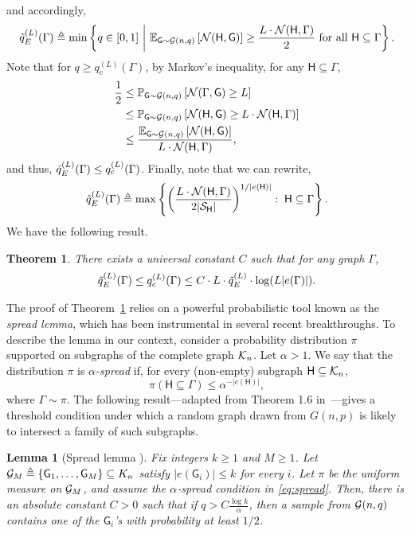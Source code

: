 \documentclass[12pt]{article}
\newtheorem{theorem}{Theorem}
\newtheorem{lemma}{Lemma}
\newcommand{\E}{\mathbb{E}}
\def\P{{\mathbb P}}
\newcommand{\calG}{{\cal G}}
\newcommand{\calK}{{\cal K}}
\newcommand{\calN}{{\cal N}}
\newcommand{\calS}{{\cal S}}
\newcommand{\p}[1]{\left(#1\right)}
\newcommand{\pp}[1]{\left[#1\right]}
\newcommand{\ppp}[1]{\left\{#1\right\}}
\newcommand{\s}[1]{\mathsf{#1}}
\begin{document}
and accordingly,
\begin{align}
    \Tilde{q}_E^{(L)}(\Gamma)\triangleq\min\ppp{q\in[0,1] ~\bigg|~ \E_{\s{G}\sim \calG(n,q)}\pp{\calN(\s{H},\s{G})}\geq \frac{L\cdot \calN(\s{H},\Gamma)}{2}\text{ for all }\s{H}\subseteq \Gamma}.
\end{align} 
Note that for $q\geq q_{c}^{(L)}(\Gamma)$, by Markov's inequality, for any $\s{H}\subseteq\Gamma$,
\begin{align}
    \frac{1}{2}&\leq \P_{\s{G}\sim \calG(n,q)}\pp{\calN(\Gamma,\s{G})\geq L}\\
    &\leq \P_{\s{G}\sim \calG(n,q)}\pp{\calN(\s{H},\s{G})\geq L\cdot \calN(\s{H},\Gamma)}\\
    &\leq \frac{\E_{\s{G}\sim \calG(n,q)}\pp{\calN(\s{H},\s{G})}}{L\cdot \calN(\s{H},\Gamma)},
\end{align}
and thus, $\Tilde{q}_E^{(L)}(\Gamma)\leq q_{c}^{(L)}(\Gamma)$. Finally, note that we can rewrite,
\begin{align}
    \Tilde{q}_E^{(L)}(\Gamma)\triangleq\max\ppp{\p{\frac{L\cdot\calN(\s{H},\Gamma)}{2|\calS_{\s{H}}|}}^{1/|e(\s{H})|}:\;\s{H}\subseteq\Gamma}.\label{eqn:EquivSpreaPro}
\end{align}
We have the following result.
\begin{theorem}\label{th:SpreadGen} There exists a universal constant $C$ such that for any graph $\Gamma$, \begin{align}
    \Tilde{q}_E^{(L)}(\Gamma)\leq q_c^{(L)}(\Gamma)\leq C\cdot L\cdot\Tilde{q}_E^{(L)}\cdot  \log(L|e(\Gamma)|).
\end{align}
\end{theorem}
The proof of Theorem~\ref{th:SpreadGen} relies on a powerful probabilistic tool known as the \emph{spread lemma}, which has been instrumental in several recent breakthroughs. To describe the lemma in our context, consider a probability distribution $\pi$ supported on subgraphs of the complete graph $\calK_n$. Let $\alpha > 1$. We say that the distribution $\pi$ is \emph{$\alpha$-spread} if, for every (non-empty) subgraph $\s{H} \subseteq \calK_n$,
\begin{equation}
\pi(\s{H} \subseteq \Gamma) \leq  \alpha^{-|e(\s{H})|},
\label{eq:spread}
\end{equation}
where $\Gamma\sim \pi$. The following result—adapted from Theorem 1.6 in~\cite{frankl2021fractional}—gives a threshold condition under which a random graph drawn from $G(n,p)$ is likely to intersect a family of such subgraphs.
\begin{lemma}[Spread lemma {\cite[Lemma 2]{mossel2022second}}]
\label{lem:spread}
Fix integers $k\geq  1$ and $M\geq  1$.  
Let $\calG_M\triangleq\ppp{\s{G}_{1},\dots ,\s{G}_{M}}\subseteq K_{n}$ satisfy $|e(\s{G}_{i})|\leq  k$ for every $i$. Let $\pi$ be the uniform measure on $\calG_M$, and assume the
\emph{$\alpha$‑spread} condition in \eqref{eq:spread}. Then, there is an absolute constant $C>0$ such that if $q>C\frac{\log k}{\alpha}$, then a sample from $\calG(n,q)$ contains one of the $\s{G}_i$'s with probability at least $1/2$.
\end{lemma}
\end{document}
